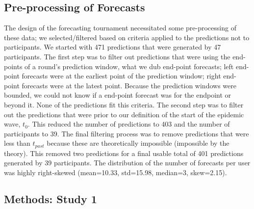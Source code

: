 \documentclass[a4paper,man,natbib]{apa6}
\begin{document}
\subsection{Pre-processing of Forecasts}
The design of the forecasting tournament necessitated some pre-processing of these data; we selected/filtered based on criteria applied to the predictions not to participants. We started with 471 predictions that were generated by 47 participants.  The first step was to filter out predictions that were using the end-points of a round's prediction window, what we dub end-point forecasts; left end-point forecasts were at the earliest point of the prediction window; right end-point forecasts were at the latest point.  Because the prediction windows were bounded, we could not know if a end-point forecast was for the endpoint or beyond it.  None of the predictions fit this criteria.  The second step was to filter out the predictions that were prior to our definition of the start of the epidemic wave, $t_0$.  This reduced the number of predictions to 403 and the number of participants to 39.  The final filtering process was to remove predictions that were less than $t_{past}$ because these are theoretically impossible (impossible by the theory).  This removed two predictions for a final usable total of 401 predictions generated by 39 participants.  The distribution of the number of forecasts per user was highly right-skewed (mean=10.33, std=15.98, median=3, skew=2.15).

\subsection{Methods: Study 1}
\end{document}
